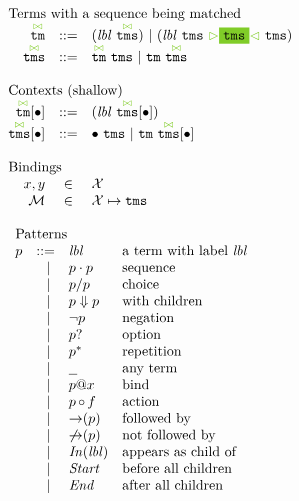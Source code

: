 \documentclass{article}
\makeatletter
\newcommand{\cursorColor}{LimeGreen}
\newcommand{\lbl}{\ensuremath{\mathit{lbl}}}
\newcommand{\tm}{\ensuremath{\mathtt{tm}}}
\newcommand{\tms}{\ensuremath{\mathtt{tms}}}
\newcommand{\Tmc}{\ensuremath{\overset{ \textcolor{\cursorColor}{\bowtie}}{\tm}}}
\newcommand{\Tmcs}{\ensuremath{\overset{\textcolor{\cursorColor}{\bowtie}}{\tms}}}
\newcommand{\mstart}{\ensuremath{\textcolor{\cursorColor}{\rhd}}}
\newcommand{\mend}{\ensuremath{\textcolor{\cursorColor}{\lhd}}}
\newcommand{\bindings}{\ensuremath{\mathcal{M}}}
\newcommand{\select}[1]{\mstart\colorbox{\cursorColor}{$#1$}\mend}
\newcommand{\pseq}[2]{\ensuremath{#1 \cdot #2}}
\newcommand{\por}[2]{\ensuremath{#1/#2}}
\newcommand{\children}[2]{\ensuremath{#1} \Downarrow #2}
\newcommand{\pnot}[1]{\ensuremath{\lnot #1}}
\newcommand{\maybe}[1]{\ensuremath{#1?}}
\newcommand{\many}[1]{\ensuremath{#1^*}}
\newcommand{\any}{\ensuremath{\text{\underline{\hspace{0.6em}}}}}
\newcommand{\bind}[2]{\ensuremath{#1@#2}}
\newcommand{\paction}[2]{\ensuremath{#1\mathop{\circ} #2}}
\newcommand{\fb}[1]{\ensuremath{\mathop{\rightarrow}(#1)}}
\newcommand{\nfb}[1]{\ensuremath{\mathop{\not\rightarrow}(#1)}}
\newcommand{\pin}[1]{\ensuremath{\mathit{In}(#1)}}
\newcommand{\pstart}{\ensuremath{\mathit{Start}}}
\newcommand{\pend}{\ensuremath{\mathit{End}}}
\newcommand{\arrayheading}[2]{\multicolumn{#1}{l}{\mbox{#2}}}
\makeatother
\begin{document}
\[
  \begin{array}{rcl}
    \arrayheading{3}{Terms with a sequence being matched}\\
    \Tmc & ::= & (\lbl~\Tmcs) ~|~ (\lbl~\tms~\select{\tms}~\tms)\\
    \Tmcs & ::= & \Tmc ~ \tms ~|~ \tm ~ \Tmcs\\
    \\
    \arrayheading{3}{Contexts (shallow)}\\
    \Tmc[\bullet] & ::= & (\lbl~\Tmcs[\bullet])\\
    \Tmcs[\bullet] & ::= & \bullet ~ \tms ~|~ \tm ~ \Tmcs[\bullet]\\
    \\
    \arrayheading{3}{Bindings}\\
    x, y      & \in & \mathcal{X}\\
    \bindings & \in & \mathcal{X} \mapsto \tms\\
    \\
    \multicolumn{3}{l}{
    \begin{array}{crll}
      \arrayheading{4}{Patterns}\\
      p & ::= & \lbl & \text{a term with label $\lbl$}\\
        & ~|~ & \pseq{p}{p} & \text{sequence}\\
        & ~|~ & \por{p}{p} & \text{choice}\\
        & ~|~ & \children{p}{p} & \text{with children}\\
        & ~|~ & \pnot{p} & \text{negation}\\
        & ~|~ & \maybe{p} & \text{option}\\
        & ~|~ & \many{p} & \text{repetition}\\
        & ~|~ & \any{} & \text{any term}\\
        & ~|~ & \bind{p}{x} & \text{bind}\\
        & ~|~ & \paction{p}{f} & \text{action}\\
        & ~|~ & \fb{p} & \text{followed by}\\
        & ~|~ & \nfb{p} & \text{not followed by}\\
        & ~|~ & \pin{\lbl} & \text{appears as child of}\\
        & ~|~ & \pstart{} & \text{before all children}\\
        & ~|~ & \pend{} & \text{after all children}\\
    \end{array}
    }\\
  \end{array}
\]
\end{document}
